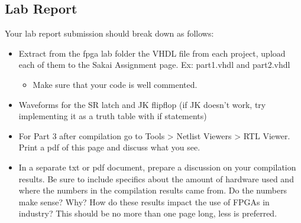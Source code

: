 \subsection{Lab Report}
Your lab report submission should break down as follows:
\begin{itemize}
	\item Extract from the fpga lab folder the VHDL file from each project, upload each of them to the Sakai Assignment page. Ex: part1.vhdl and part2.vhdl
	\begin{itemize}
		\item Make sure that your code is well commented.
	\end{itemize}
	\item Waveforms for the SR latch and JK flipflop (if JK doesn't work, try implementing it as a truth table with if statements)
	\item For Part 3 after compilation go to Tools > Netlist Viewers > RTL Viewer. Print a pdf of this page and discuss what you see.
	\item In a separate txt or pdf document, prepare a discussion on your compilation results. Be sure to include specifics about the amount of hardware used and where the numbers in the compilation results came from. Do the numbers make sense? Why? How do these results impact the use of FPGAs in industry? This should be no more than one page long, less is preferred.
\end{itemize}

